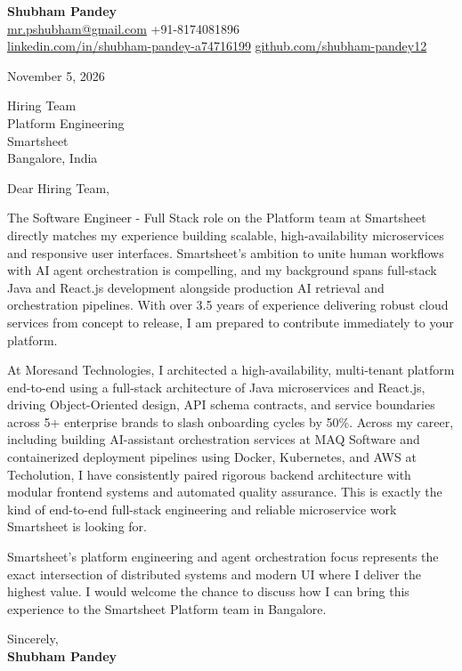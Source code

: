 \documentclass[a4paper,11pt]{article}
\begin{document}
\textbf{\Large Shubham Pandey}\\
\href{mailto:mr.pshubham@gmail.com}{mr.pshubham@gmail.com} \quad +91-8174081896\\
\href{https://www.linkedin.com/in/shubham-pandey-a74716199/}{linkedin.com/in/shubham-pandey-a74716199} \quad
\href{https://github.com/shubham-pandey12}{github.com/shubham-pandey12}

\vspace{1em}
November 5, 2026

\vspace{1em}
Hiring Team\\
Platform Engineering\\
Smartsheet\\
Bangalore, India

\vspace{1em}
Dear Hiring Team,

The Software Engineer - Full Stack role on the Platform team at Smartsheet directly matches my experience building scalable, high-availability microservices and responsive user interfaces. Smartsheet's ambition to unite human workflows with AI agent orchestration is compelling, and my background spans full-stack Java and React.js development alongside production AI retrieval and orchestration pipelines. With over 3.5 years of experience delivering robust cloud services from concept to release, I am prepared to contribute immediately to your platform.

At Moresand Technologies, I architected a high-availability, multi-tenant platform end-to-end using a full-stack architecture of Java microservices and React.js, driving Object-Oriented design, API schema contracts, and service boundaries across 5+ enterprise brands to slash onboarding cycles by 50\%. Across my career, including building AI-assistant orchestration services at MAQ Software and containerized deployment pipelines using Docker, Kubernetes, and AWS at Techolution, I have consistently paired rigorous backend architecture with modular frontend systems and automated quality assurance. This is exactly the kind of end-to-end full-stack engineering and reliable microservice work Smartsheet is looking for.

Smartsheet's platform engineering and agent orchestration focus represents the exact intersection of distributed systems and modern UI where I deliver the highest value. I would welcome the chance to discuss how I can bring this experience to the Smartsheet Platform team in Bangalore.

\vspace{1em}
Sincerely,\\[0.5em]
\textbf{Shubham Pandey}
\end{document}
